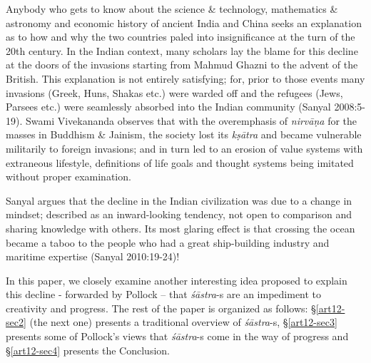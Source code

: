 Anybody who gets to know about the science \& technology, mathematics \& astronomy and economic history of ancient India and China seeks an explanation as to how and why the two countries paled into insigniﬁcance at the turn of the 20th century. In the Indian context, many scholars lay the blame for this decline at the doors of the invasions starting from Mahmud Ghazni to the advent of the British. This explanation is not entirely satisfying; for, prior to those events many invasions (Greek, Huns, Shakas etc.) were warded off and the refugees (Jews, Parsees etc.) were seamlessly absorbed into the Indian community (Sanyal 2008:5-19). Swami Vivekananda  observes that with the overemphasis of {\sl nirvāṇa} for the masses in Buddhism \& Jainism, the society lost its {\sl kṣātra} and became vulnerable militarily to foreign invasions; and in turn led to an erosion of value systems with extraneous lifestyle, definitions of life goals and thought systems being imitated without proper examination. 

Sanyal  argues that the decline in the Indian civilization was due to a change in mindset; described as an inward-looking tendency, not open to comparison and sharing knowledge with others. Its most glaring effect is that crossing the ocean became a taboo to the people who had a great ship-building industry and maritime expertise (Sanyal 2010:19-24)!

In this paper, we closely examine another interesting idea proposed to explain this decline - forwarded by Pollock -- that {\sl śāstra}-s are an impediment to creativity and progress. The rest of the paper is organized as follows: \S\ref{art12-sec2} (the next one) presents a traditional overview of {\sl śāstra}-s, \S\ref{art12-sec3} presents some of Pollock's views that {\sl śāstra}-s come in the way of progress and \S\ref{art12-sec4} presents the Conclusion.\\[-20pt]


